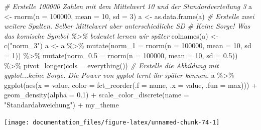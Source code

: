 \documentclass[
]{article}
\newenvironment{Shaded}{\begin{snugshade}}{\end{snugshade}}
\newcommand{\AttributeTok}[1]{\textcolor[rgb]{0.77,0.63,0.00}{#1}}
\newcommand{\CommentTok}[1]{\textcolor[rgb]{0.56,0.35,0.01}{\textit{#1}}}
\newcommand{\DecValTok}[1]{\textcolor[rgb]{0.00,0.00,0.81}{#1}}
\newcommand{\FloatTok}[1]{\textcolor[rgb]{0.00,0.00,0.81}{#1}}
\newcommand{\FunctionTok}[1]{\textcolor[rgb]{0.00,0.00,0.00}{#1}}
\newcommand{\NormalTok}[1]{#1}
\newcommand{\OtherTok}[1]{\textcolor[rgb]{0.56,0.35,0.01}{#1}}
\newcommand{\SpecialCharTok}[1]{\textcolor[rgb]{0.00,0.00,0.00}{#1}}
\newcommand{\StringTok}[1]{\textcolor[rgb]{0.31,0.60,0.02}{#1}}
\begin{document}
\begin{Shaded}
\begin{Highlighting}[]
\CommentTok{\# Erstelle 100000 Zahlen mit dem Mittelwert 10 und der Standardverteilung 3}
\NormalTok{a }\OtherTok{\textless{}{-}} \FunctionTok{rnorm}\NormalTok{(}\AttributeTok{n =} \DecValTok{100000}\NormalTok{, }\AttributeTok{mean =} \DecValTok{10}\NormalTok{, }\AttributeTok{sd =} \DecValTok{3}\NormalTok{)}
\NormalTok{a }\OtherTok{\textless{}{-}} \FunctionTok{as.data.frame}\NormalTok{(a)}
\CommentTok{\# Erstelle zwei weitere Spalten. Selber Mittelwert aber unterschiedliche SD }
\CommentTok{\# Keine Sorge! Was das komische Symbol \%\textgreater{}\% bedeutet lernen wir später}
\FunctionTok{colnames}\NormalTok{(a) }\OtherTok{\textless{}{-}} \FunctionTok{c}\NormalTok{(}\StringTok{"norm\_3"}\NormalTok{)}
\NormalTok{a }\OtherTok{\textless{}{-}}\NormalTok{ a }\SpecialCharTok{\%\textgreater{}\%}
    \FunctionTok{mutate}\NormalTok{(}\AttributeTok{norm\_1 =} \FunctionTok{rnorm}\NormalTok{(}\AttributeTok{n =} \DecValTok{100000}\NormalTok{, }\AttributeTok{mean =} \DecValTok{10}\NormalTok{, }\AttributeTok{sd =} \DecValTok{1}\NormalTok{)) }\SpecialCharTok{\%\textgreater{}\%}
    \FunctionTok{mutate}\NormalTok{(}\AttributeTok{norm\_0.5 =} \FunctionTok{rnorm}\NormalTok{(}\AttributeTok{n =} \DecValTok{100000}\NormalTok{, }\AttributeTok{mean =} \DecValTok{10}\NormalTok{, }\AttributeTok{sd =} \FloatTok{0.5}\NormalTok{)) }\SpecialCharTok{\%\textgreater{}\%}
    \FunctionTok{pivot\_longer}\NormalTok{(}\AttributeTok{cols =} \FunctionTok{everything}\NormalTok{())}
\CommentTok{\# Erstelle die Abbildung mit ggplot...keine Sorge. Die Power von ggplot lernt ihr später kennen. }
\NormalTok{a }\SpecialCharTok{\%\textgreater{}\%}
    \FunctionTok{ggplot}\NormalTok{(}\FunctionTok{aes}\NormalTok{(}\AttributeTok{x =}\NormalTok{ value, }\AttributeTok{color =} \FunctionTok{fct\_reorder}\NormalTok{(}\AttributeTok{.f =}\NormalTok{ name, }\AttributeTok{.x =}\NormalTok{ value, }\AttributeTok{.fun =}\NormalTok{ max))) }\SpecialCharTok{+}
    \FunctionTok{geom\_density}\NormalTok{(}\AttributeTok{alpha =} \FloatTok{0.1}\NormalTok{) }\SpecialCharTok{+}
    \FunctionTok{scale\_color\_discrete}\NormalTok{(}\AttributeTok{name =} \StringTok{"Standardabweichung"}\NormalTok{) }\SpecialCharTok{+}
\NormalTok{    my\_theme}
\end{Highlighting}
\end{Shaded}

\begin{center}\texttt{[image: documentation\_files/figure-latex/unnamed-chunk-74-1]} \end{center}
\end{document}
